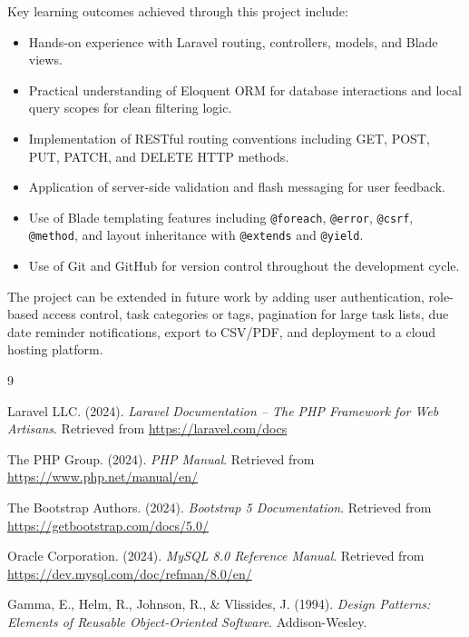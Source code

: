 \documentclass[12pt,a4paper]{report}
\begin{document}
Key learning outcomes achieved through this project include:
\begin{itemize}[leftmargin=1.5cm]
    \item Hands-on experience with Laravel routing, controllers, models, and
    Blade views.
    \item Practical understanding of Eloquent ORM for database interactions and
    local query scopes for clean filtering logic.
    \item Implementation of RESTful routing conventions including GET, POST, PUT,
    PATCH, and DELETE HTTP methods.
    \item Application of server-side validation and flash messaging for user feedback.
    \item Use of Blade templating features including \texttt{@foreach}, \texttt{@error},
    \texttt{@csrf}, \texttt{@method}, and layout inheritance with \texttt{@extends}
    and \texttt{@yield}.
    \item Use of Git and GitHub for version control throughout the development cycle.
\end{itemize}

The project can be extended in future work by adding user authentication,
role-based access control, task categories or tags, pagination for large task lists,
due date reminder notifications, export to CSV/PDF, and deployment to a cloud
hosting platform.

\begin{thebibliography}{9}

Laravel LLC. (2024). \textit{Laravel Documentation -- The PHP Framework for Web
Artisans}. Retrieved from \url{https://laravel.com/docs}

The PHP Group. (2024). \textit{PHP Manual}. Retrieved from
\url{https://www.php.net/manual/en/}

The Bootstrap Authors. (2024). \textit{Bootstrap 5 Documentation}. Retrieved from
\url{https://getbootstrap.com/docs/5.0/}

Oracle Corporation. (2024). \textit{MySQL 8.0 Reference Manual}. Retrieved from
\url{https://dev.mysql.com/doc/refman/8.0/en/}

Gamma, E., Helm, R., Johnson, R., \& Vlissides, J. (1994). \textit{Design Patterns:
Elements of Reusable Object-Oriented Software}. Addison-Wesley.

\end{thebibliography}
\end{document}
